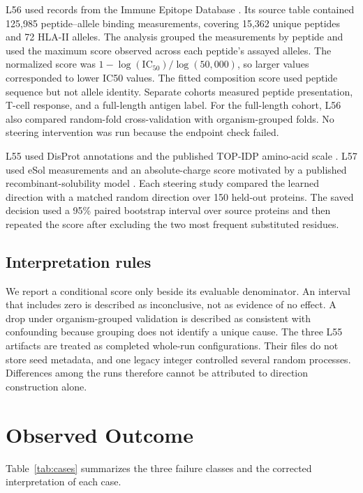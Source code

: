 \documentclass{article}
\begin{document}
L56 used records from the Immune Epitope Database
\citep{vita2019iedb}. Its source table contained 125,985 peptide--allele
binding measurements, covering 15,362 unique peptides and 72 HLA-II alleles.
The analysis grouped the measurements by peptide and used the maximum score
observed across each peptide's assayed alleles. The normalized score was
$1-\log(\mathrm{IC}_{50})/\log(50{,}000)$, so larger values corresponded to
lower IC50 values. The fitted composition score used peptide sequence but not
allele identity. Separate cohorts measured peptide presentation, T-cell
response, and a full-length antigen label. For the full-length cohort, L56
also compared random-fold cross-validation with organism-grouped folds. No
steering intervention was run because the endpoint check failed.

L55 used DisProt annotations \citep{quaglia2022disprot} and the published
TOP-IDP amino-acid scale \citep{campen2008topidp}. L57 used eSol
measurements \citep{niwa2009esol} and an absolute-charge score motivated by
a published recombinant-solubility model
\citep{wilkinson1991solubility}. Each steering study compared the learned
direction with a matched random direction over 150 held-out proteins. The
saved decision used a 95\% paired bootstrap interval over source proteins and
then repeated the score after excluding the two most frequent substituted
residues.

\subsection{Interpretation rules}

We report a conditional score only beside its evaluable denominator. An
interval that includes zero is described as inconclusive, not as evidence of
no effect. A drop under organism-grouped validation is described as
consistent with confounding because grouping does not identify a unique
cause. The three L55 artifacts are treated as completed whole-run
configurations. Their files do not store seed metadata, and one legacy
integer controlled several random processes. Differences among the runs
therefore cannot be attributed to direction construction alone.

\section{Observed Outcome}
\label{sec:outcome}

Table~\ref{tab:cases} summarizes the three failure classes and the corrected
interpretation of each case.
\end{document}
